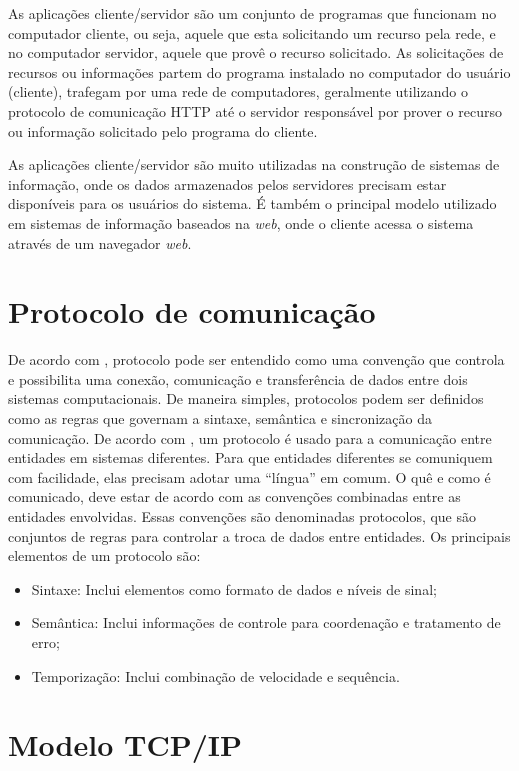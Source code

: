 As aplicações cliente/servidor são um conjunto de programas que funcionam no 
computador cliente, ou seja, aquele que esta solicitando um recurso pela rede, 
e no computador servidor, aquele que provê o recurso solicitado. As 
solicitações de recursos ou informações partem do programa instalado no 
computador do usuário (cliente), trafegam por uma rede de computadores, 
geralmente utilizando o protocolo de comunicação HTTP até o servidor 
responsável por prover o recurso ou informação solicitado pelo programa do 
cliente.

As aplicações cliente/servidor são muito utilizadas na construção de sistemas 
de informação, onde os dados armazenados pelos servidores precisam estar 
disponíveis para os usuários do sistema. É também o principal modelo utilizado 
em sistemas de informação baseados na \textit{web}, onde o cliente acessa o 
sistema através de um navegador \textit{web}.

\section{Protocolo de comunicação}

De acordo com , protocolo pode ser entendido como uma 
convenção que controla e possibilita uma conexão, comunicação e transferência 
de dados entre dois sistemas computacionais. De maneira simples, protocolos 
podem ser definidos como as regras que governam a sintaxe, semântica e 
sincronização da comunicação. 
De acordo com , um protocolo é usado para a 
comunicação entre entidades em sistemas diferentes. Para que entidades 
diferentes se comuniquem com facilidade, elas precisam adotar uma ``língua'' em 
comum. O quê e como é comunicado, deve estar de acordo com as convenções 
combinadas entre as entidades envolvidas. Essas convenções são denominadas 
protocolos, que são conjuntos de regras para controlar a troca de 
dados entre entidades. Os principais elementos de um protocolo são:

\begin{itemize}
	\item Sintaxe: Inclui elementos como formato de dados e níveis de sinal;
	\item Semântica: Inclui informações de controle para coordenação e 
	tratamento de erro;
	\item Temporização: Inclui combinação de velocidade e sequência.
\end{itemize}

\section{Modelo TCP/IP}


